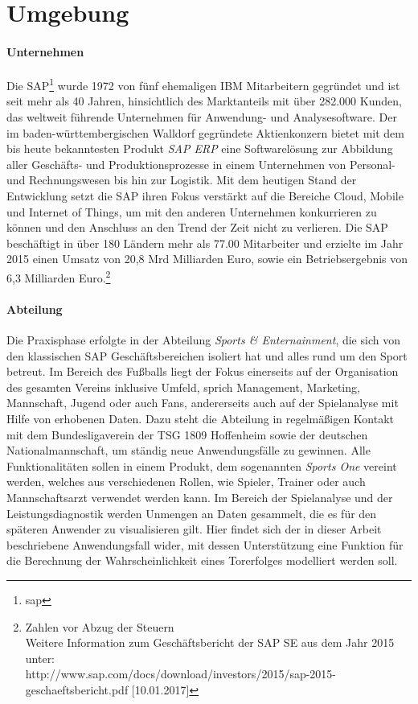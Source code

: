 \section{Umgebung}
\paragraph{Unternehmen}
Die SAP\footnote{\gls{sap}} wurde 1972 von fünf ehemaligen IBM Mitarbeitern gegründet und ist seit mehr als 40 Jahren, hinsichtlich des Marktanteils mit über 282.000 Kunden, das weltweit führende Unternehmen für Anwendung- und Analysesoftware. Der im baden-württembergischen Walldorf gegründete Aktienkonzern bietet mit dem bis heute bekanntesten Produkt \textit{SAP ERP} eine Softwarelösung zur Abbildung aller Geschäfts- und Produktionsprozesse in einem Unternehmen von Personal- und Rechnungswesen bis hin zur Logistik. Mit dem heutigen Stand der Entwicklung setzt die SAP ihren Fokus verstärkt auf die Bereiche Cloud, Mobile und Internet of Things, um mit den anderen Unternehmen konkurrieren zu können und den Anschluss an den Trend der Zeit nicht zu verlieren. Die SAP beschäftigt in über 180 Ländern mehr als 77.00 Mitarbeiter und erzielte im Jahr 2015 einen Umsatz von 20,8 Mrd Milliarden Euro, sowie ein Betriebsergebnis von 6,3 Milliarden Euro.\footnote{Zahlen vor Abzug der Steuern\\ Weitere Information zum Geschäftsbericht der SAP SE aus dem Jahr 2015 unter: \\ http://www.sap.com/docs/download/investors/2015/sap-2015-geschaeftsbericht.pdf [10.01.2017]}

\paragraph{Abteilung}
Die Praxisphase erfolgte in der Abteilung \textit{Sports \& Enternainment}, die sich von den klassischen SAP Geschäftsbereichen isoliert hat und alles rund um den Sport betreut. Im Bereich des Fußballs liegt der Fokus einerseits auf der Organisation des gesamten Vereins inklusive Umfeld, sprich Management, Marketing, Mannschaft, Jugend oder auch Fans, andererseits auch auf der Spielanalyse mit Hilfe von erhobenen Daten. Dazu steht die Abteilung in regelmäßigen Kontakt mit dem Bundesligaverein der TSG 1809 Hoffenheim sowie der deutschen Nationalmannschaft, um ständig neue Anwendungsfälle zu gewinnen. Alle Funktionalitäten sollen in einem Produkt, dem sogenannten \textit{Sports One} vereint werden, welches aus verschiedenen Rollen, wie Spieler, Trainer oder auch Mannschaftsarzt verwendet werden kann. Im Bereich der Spielanalyse und der Leistungsdiagnostik werden Unmengen an Daten gesammelt, die es für den späteren Anwender zu visualisieren gilt. Hier findet sich der in dieser Arbeit beschriebene Anwendungsfall wider, mit dessen Unterstützung eine Funktion für die Berechnung der Wahrscheinlichkeit eines Torerfolges modelliert werden soll.